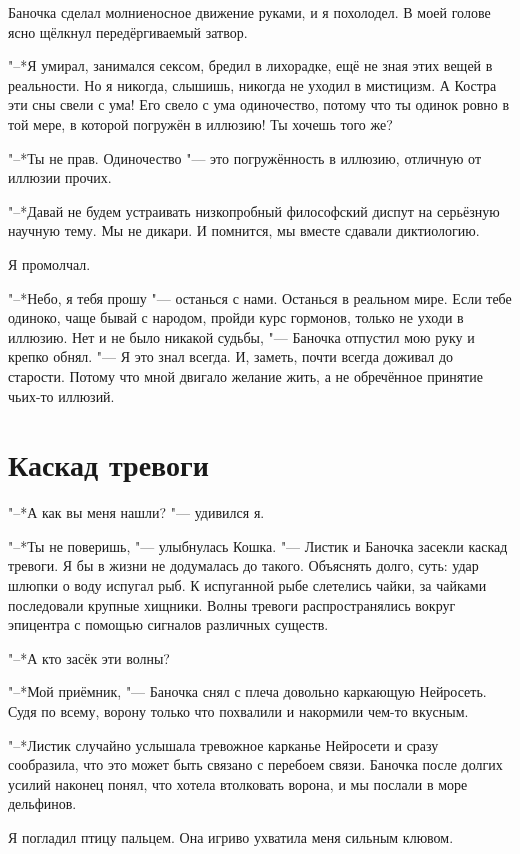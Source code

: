\documentclass[a4paper,10pt]{book}
\begin{document}
Баночка сделал молниеносное движение руками, и я похолодел. В моей голове ясно щёлкнул передёргиваемый затвор.

"--*Я умирал, занимался сексом, бредил в лихорадке, ещё не зная этих вещей в реальности. Но я никогда, слышишь, никогда не уходил в мистицизм. А Костра 
эти
сны свели с ума! Его свело с ума одиночество, потому что
ты одинок ровно в той мере, в которой погружён в иллюзию! Ты хочешь того же?

"--*Ты не прав. Одиночество "--- это погружённость в иллюзию, отличную от 
иллюзии прочих.

"--*Давай не будем устраивать низкопробный философский диспут на серьёзную 
научную тему.
Мы не дикари. И помнится, мы вместе сдавали диктиологию.

Я промолчал.

"--*Небо, я тебя прошу "--- останься с нами. Останься в реальном мире. Если 
тебе одиноко,
чаще бывай с народом, пройди курс гормонов, только не уходи в иллюзию.
Нет и не было никакой судьбы, "--- Баночка отпустил мою руку и крепко обнял.
"--- Я это знал всегда. И, заметь, почти всегда доживал до старости. Потому что 
мной двигало
желание жить, а не обречённое принятие чьих-то иллюзий.

\section{Каскад тревоги}

"--*А как вы меня нашли? "--- удивился я.

"--*Ты не поверишь, "--- улыбнулась Кошка. "--- Листик и Баночка засекли каскад 
тревоги. Я бы в жизни не додумалась до такого. Объяснять долго, суть: удар 
шлюпки о воду испугал рыб. К испуганной рыбе слетелись чайки, за чайками 
последовали крупные хищники. Волны тревоги распространялись вокруг эпицентра с 
помощью сигналов различных существ.

"--*А кто засёк эти волны?

"--*Мой приёмник, "--- Баночка снял с плеча довольно каркающую Нейросеть. Судя 
по всему, ворону только что похвалили и накормили чем-то вкусным.

"--*Листик случайно услышала тревожное карканье Нейросети и сразу сообразила, 
что это может быть связано с перебоем связи. Баночка после долгих усилий 
наконец понял, что хотела втолковать ворона, и мы послали в море дельфинов.

Я погладил птицу пальцем. Она игриво ухватила меня сильным клювом.
\end{document}
